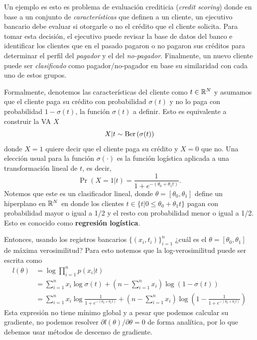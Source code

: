 Un ejemplo es esto es problema de evaluación crediticia (\textit{credit scoring}) donde en base a un conjunto de \textit{características} que definen a un cliente, un ejecutivo bancario debe evaluar si otorgarle o no el crédito que el cliente solicita. Para tomar esta decisión, el ejecutivo puede revisar la base de datos del banco e identificar los clientes que en el pasado pagaron o no pagaron sus créditos para determinar el perfil del \textit{pagador} y el del \textit{no-pagador}. Finalmente, un nuevo cliente puede ser \textit{clasificado} como pagador/no-pagador en base su similaridad con cada uno de estos grupos. 

Formalmente, denotemos las características del cliente como $t\in{\mathbb R}^N$ y asumamos que el cliente paga su crédito con probabilidad $\sigma(t)$ y no lo paga con probabilidad $1- \sigma(t)$, la función $\sigma(t)$ a definir. Esto es equivalente a construir la VA $X$
\begin{equation}
 	X|t \sim \text{Ber}\left(\sigma(t)\right)
 \end{equation} 
 donde $X=1$ quiere decir que el cliente paga su crédito y $X=0$ que no. Una elección usual para la función $\sigma(\cdot)$ es la función logística aplicada a una transformación lineal de $t$, es decir, 
 \begin{equation}
 	\Pr{(X=1|t)} = \frac{1}{1+e^{-(\theta_0 + \theta_1 t)	}}.
 \end{equation}
Notemos que este es un clasificador lineal, donde $\theta = [\theta_0, \theta_1]$ define un hiperplano en ${\mathbb R}^N$ en donde los clientes $t\in\{t | 0\leq \theta_0 + \theta_1 t\}$ pagan con probabilidad mayor o igual a 1/2 y el resto con probabilidad menor o igual a 1/2. Esto es conocido como \textbf{regresión logística}. 

Entonces, usando los registros bancarios $\{(x_i,t_i)\}_{i=1}^n$ ¿cuál es el $\theta = [\theta_0, \theta_1]$ de máxima verosimilitud? Para esto notemos que la log-verosimilitud puede ser escrita como 
\begin{align*}
	l(\theta) &= \log \prod_{i=1}^n p(x_i|t) \\
			  &= \sum_{i=1}^n x_i \log \sigma(t) + \left(n-\sum_{i=1}^n x_i\right)\log(1-\sigma(t))\\
			  &= \sum_{i=1}^n x_i \log \frac{1}{1+e^{-(\theta_0 + \theta_1 t)	}} + \left(n-\sum_{i=1}^n x_i\right)\log(1-\frac{1}{1+e^{-(\theta_0 + \theta_1 t)	}})
\end{align*}
Esta expresión no tiene mínimo global y a pesar que podemos calcular su gradiente, no podemos resolver $\partial l(\theta)/\partial \theta =0$ de forma analítica, por lo que debemos usar métodos de descenso de gradiente.  


